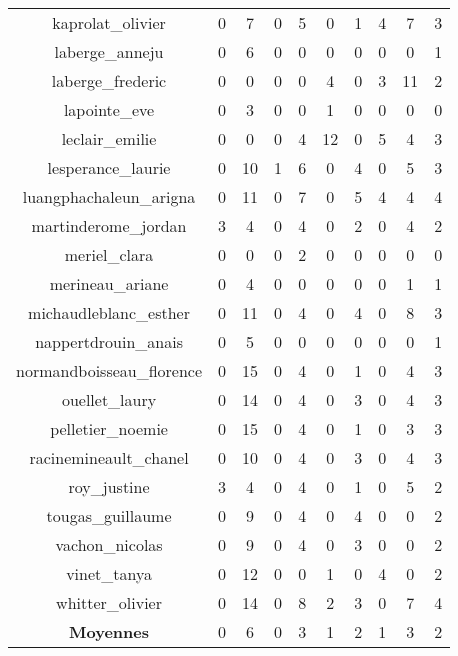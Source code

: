 \documentclass[12pt]{article}
\begin{document}
\begin{table}[H]
\begin{tabular}{|ccccccccc|c|}
  kaprolat\_olivier & 0 & 7 & 0 & 5 & 0 & 1 & 4 & 7 & 3 \\ 
  laberge\_anneju & 0 & 6 & 0 & 0 & 0 & 0 & 0 & 0 & 1 \\ 
  laberge\_frederic & 0 & 0 & 0 & 0 & 4 & 0 & 3 & 11 & 2 \\ 
  lapointe\_eve & 0 & 3 & 0 & 0 & 1 & 0 & 0 & 0 & 0 \\ 
  leclair\_emilie & 0 & 0 & 0 & 4 & 12 & 0 & 5 & 4 & 3 \\ 
  lesperance\_laurie & 0 & 10 & 1 & 6 & 0 & 4 & 0 & 5 & 3 \\ 
  luangphachaleun\_arigna & 0 & 11 & 0 & 7 & 0 & 5 & 4 & 4 & 4 \\ 
  martinderome\_jordan & 3 & 4 & 0 & 4 & 0 & 2 & 0 & 4 & 2 \\ 
  meriel\_clara & 0 & 0 & 0 & 2 & 0 & 0 & 0 & 0 & 0 \\ 
  merineau\_ariane & 0 & 4 & 0 & 0 & 0 & 0 & 0 & 1 & 1 \\ 
  michaudleblanc\_esther & 0 & 11 & 0 & 4 & 0 & 4 & 0 & 8 & 3 \\ 
  nappertdrouin\_anais & 0 & 5 & 0 & 0 & 0 & 0 & 0 & 0 & 1 \\ 
  normandboisseau\_florence & 0 & 15 & 0 & 4 & 0 & 1 & 0 & 4 & 3 \\ 
  ouellet\_laury & 0 & 14 & 0 & 4 & 0 & 3 & 0 & 4 & 3 \\ 
  pelletier\_noemie & 0 & 15 & 0 & 4 & 0 & 1 & 0 & 3 & 3 \\ 
  racinemineault\_chanel & 0 & 10 & 0 & 4 & 0 & 3 & 0 & 4 & 3 \\ 
  roy\_justine & 3 & 4 & 0 & 4 & 0 & 1 & 0 & 5 & 2 \\ 
  tougas\_guillaume & 0 & 9 & 0 & 4 & 0 & 4 & 0 & 0 & 2 \\ 
  vachon\_nicolas & 0 & 9 & 0 & 4 & 0 & 3 & 0 & 0 & 2 \\ 
  vinet\_tanya & 0 & 12 & 0 & 0 & 1 & 0 & 4 & 0 & 2 \\ 
  whitter\_olivier & 0 & 14 & 0 & 8 & 2 & 3 & 0 & 7 & 4 \\ 
  \hline
 \textbf{Moyennes} & 0 & 6 & 0 & 3 & 1 & 2 & 1 & 3 & 2 \\ 
   \hline
\end{tabular}
\end{table}
\clearpage
\end{document}
